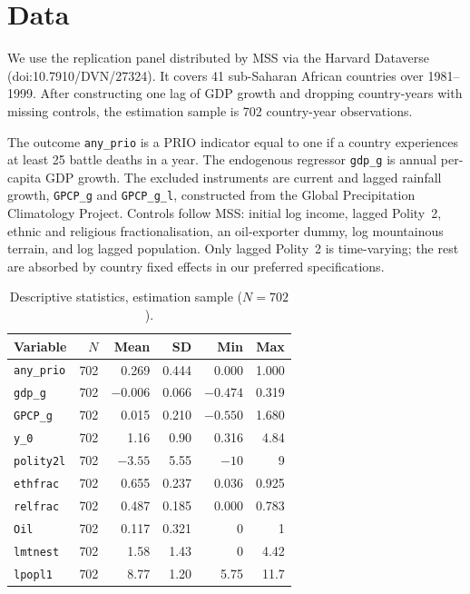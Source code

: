 \documentclass[11pt,a4paper]{article}
\begin{document}
\section{Data}\label{sec:data}
We use the replication panel distributed by MSS via the Harvard
Dataverse (doi:10.7910/DVN/27324). It covers 41 sub-Saharan African
countries over 1981--1999. After constructing one lag of GDP growth and
dropping country-years with missing controls, the estimation sample is
702 country-year observations.

The outcome \texttt{any\_prio} is a PRIO indicator equal to one if a
country experiences at least 25 battle deaths in a year. The endogenous
regressor \texttt{gdp\_g} is annual per-capita GDP growth. The excluded
instruments are current and lagged rainfall growth, \texttt{GPCP\_g}
and \texttt{GPCP\_g\_l}, constructed from the Global Precipitation
Climatology Project. Controls follow MSS: initial log income, lagged
Polity~2, ethnic and religious fractionalisation, an oil-exporter
dummy, log mountainous terrain, and log lagged population. Only lagged
Polity~2 is time-varying; the rest are absorbed by country fixed
effects in our preferred specifications.

\begin{table}[H]
\centering
\caption{Descriptive statistics, estimation sample ($N = 702$).}
\label{tab:descriptives}
\begin{tabular}{lrrrrr}
\toprule
Variable & $N$ & Mean & SD & Min & Max \\
\midrule
\texttt{any\_prio}  & 702 & 0.269   & 0.444 & 0.000   & 1.000 \\
\texttt{gdp\_g}     & 702 & $-0.006$ & 0.066 & $-0.474$ & 0.319 \\
\texttt{GPCP\_g}    & 702 & 0.015   & 0.210 & $-0.550$ & 1.680 \\
\texttt{y\_0}       & 702 & 1.16    & 0.90  & 0.316   & 4.84  \\
\texttt{polity2l}   & 702 & $-3.55$ & 5.55  & $-10$   & 9     \\
\texttt{ethfrac}    & 702 & 0.655   & 0.237 & 0.036   & 0.925 \\
\texttt{relfrac}    & 702 & 0.487   & 0.185 & 0.000   & 0.783 \\
\texttt{Oil}        & 702 & 0.117   & 0.321 & 0       & 1     \\
\texttt{lmtnest}    & 702 & 1.58    & 1.43  & 0       & 4.42  \\
\texttt{lpopl1}     & 702 & 8.77    & 1.20  & 5.75    & 11.7  \\
\bottomrule
\end{tabular}
\end{table}
\end{document}
